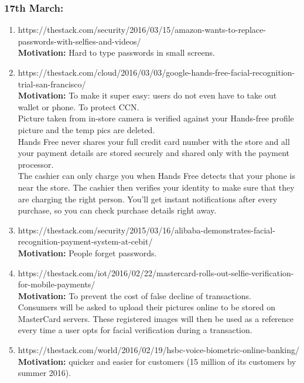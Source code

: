 \documentclass[11pt]{article}
\begin{document}
\subsubsection*{17th March:}
\begin{enumerate}
 \item https://thestack.com/security/2016/03/15/amazon-wants-to-replace-passwords-with-selfies-and-videos/\\
 \textbf{Motivation:} Hard to type passwords in small screens.
 \item https://thestack.com/cloud/2016/03/03/google-hands-free-facial-recognition-trial-san-francisco/\\
 \textbf{Motivation:} To make it super easy: users do not even have to take out wallet or phone. To protect CCN.\\
 
Picture taken from in-store camera is verified against your Hands-free profile picture and the temp pics are deleted.\\

Hands Free never shares your full credit card number with the store and all your payment details are stored securely and shared only with the payment 
processor.\\

The cashier can only charge you when Hands Free detects that your phone is near the store. The cashier then verifies your identity to make sure that 
they are charging the right person. You'll get instant notifications after every purchase, so you can check purchase details right away.
 
 \item https://thestack.com/security/2015/03/16/alibaba-demonstrates-facial-recognition-payment-system-at-cebit/\\
 \textbf{Motivation:} People forget passwords.
 
 \item https://thestack.com/iot/2016/02/22/mastercard-rolls-out-selfie-verification-for-mobile-payments/\\
 \textbf{Motivation:} To prevent the cost of false decline of transactions.\\
 
 Consumers will be asked to upload their pictures online to be stored on MasterCard servers. These registered images will then be used as a reference 
 every time a user opts for facial verification during a transaction.\\
 
 \item https://thestack.com/world/2016/02/19/hsbc-voice-biometric-online-banking/\\
 \textbf{Motivation:} quicker and easier for customers (15 million of its customers by summer 2016).\\
 

\end{enumerate}
\end{document}

